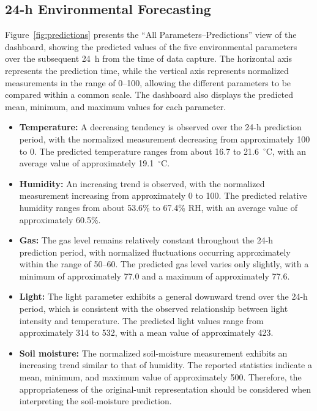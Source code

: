 ﻿\documentclass[journal]{IEEEtran}
\begin{document}
\subsection{24-h Environmental Forecasting}

Figure~\ref{fig:predictions} presents the ``All Parameters--Predictions''
view of the dashboard, showing the predicted values of the five environmental
parameters over the subsequent 24~h from the time of data capture. The
horizontal axis represents the prediction time, while the vertical axis
represents normalized measurements in the range of 0--100, allowing the
different parameters to be compared within a common scale. The dashboard
also displays the predicted mean, minimum, and maximum values for each
parameter.

\begin{itemize}
    \item \textbf{Temperature:} A decreasing tendency is observed over the
    24-h prediction period, with the normalized measurement decreasing from
    approximately 100 to 0. The predicted temperature ranges from about
    16.7 to 21.6~$^\circ$C, with an average value of approximately
    19.1~$^\circ$C.

    \item \textbf{Humidity:} An increasing trend is observed, with the
    normalized measurement increasing from approximately 0 to 100. The
    predicted relative humidity ranges from about 53.6\% to 67.4\% RH,
    with an average value of approximately 60.5\%.

    \item \textbf{Gas:} The gas level remains relatively constant throughout
    the 24-h prediction period, with normalized fluctuations occurring
    approximately within the range of 50--60. The predicted gas level varies
    only slightly, with a minimum of approximately 77.0 and a maximum of
    approximately 77.6.

    \item \textbf{Light:} The light parameter exhibits a general downward
    trend over the 24-h period, which is consistent with the observed
    relationship between light intensity and temperature. The predicted
    light values range from approximately 314 to 532, with a mean value of
    approximately 423.

    \item \textbf{Soil moisture:} The normalized soil-moisture measurement
    exhibits an increasing trend similar to that of humidity. The reported
    statistics indicate a mean, minimum, and maximum value of approximately
    500. Therefore, the appropriateness of the original-unit representation
    should be considered when interpreting the soil-moisture prediction.
\end{itemize}
\end{document}
